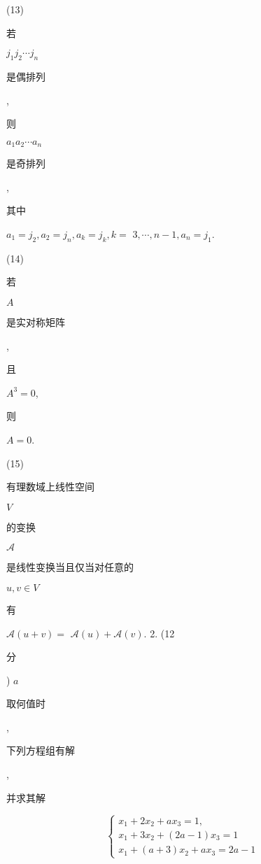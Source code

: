 \documentclass[10pt]{article}
\begin{document}
(13) \begin{CJK}{UTF8}{mj}若\end{CJK} $j_{1} j_{2} \cdots j_{n}$ \begin{CJK}{UTF8}{mj}是偶排列\end{CJK}, \begin{CJK}{UTF8}{mj}则\end{CJK} $a_{1} a_{2} \cdots a_{n}$ \begin{CJK}{UTF8}{mj}是奇排列\end{CJK}, \begin{CJK}{UTF8}{mj}其中\end{CJK} $a_{1}=j_{2}, a_{2}=j_{n}, a_{k}=j_{k}, k=$ $3, \cdots, n-1, a_{n}=j_{1}$.

(14) \begin{CJK}{UTF8}{mj}若\end{CJK} $A$ \begin{CJK}{UTF8}{mj}是实对称矩阵\end{CJK}, \begin{CJK}{UTF8}{mj}且\end{CJK} $A^{3}=0$, \begin{CJK}{UTF8}{mj}则\end{CJK} $A=0$.

(15) \begin{CJK}{UTF8}{mj}有理数域上线性空间\end{CJK} $V$ \begin{CJK}{UTF8}{mj}的变换\end{CJK} $\mathscr{A}$ \begin{CJK}{UTF8}{mj}是线性变换当且仅当对任意的\end{CJK} $u, v \in V$ \begin{CJK}{UTF8}{mj}有\end{CJK} $\mathscr{A}(u+v)=$ $\mathscr{A}(u)+\mathscr{A}(v) .$ 2. (12 \begin{CJK}{UTF8}{mj}分\end{CJK}) $a$ \begin{CJK}{UTF8}{mj}取何值时\end{CJK}, \begin{CJK}{UTF8}{mj}下列方程组有解\end{CJK}, \begin{CJK}{UTF8}{mj}并求其解\end{CJK}
$$
\left\{\begin{array}{l}
x_{1}+2 x_{2}+a x_{3}=1, \\
x_{1}+3 x_{2}+(2 a-1) x_{3}=1 \\
x_{1}+(a+3) x_{2}+a x_{3}=2 a-1
\end{array}\right.
$$
\end{document}
